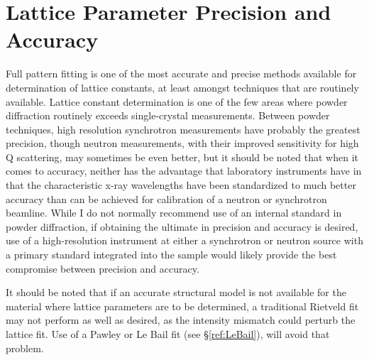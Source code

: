 \section{Lattice Parameter Precision and Accuracy}

Full pattern fitting is one of the most accurate and precise methods available for determination of lattice constants, at least amongst techniques that are routinely available. Lattice constant determination is one of the few areas where powder diffraction routinely exceeds single-crystal measurements. Between powder techniques, high resolution synchrotron measurements have probably the greatest precision, though neutron measurements, with their improved sensitivity for high Q scattering, may sometimes be even better, but it should be noted that when it comes to accuracy, neither has the advantage that laboratory instruments have in that the characteristic x-ray wavelengths have been standardized to much better accuracy than can be achieved for calibration of a neutron or synchrotron beamline. While I do not normally recommend use of an internal standard in powder diffraction, if obtaining the ultimate in precision and accuracy is desired, use of a high-resolution instrument at either a synchrotron or neutron source with a primary standard integrated into the sample would likely provide the best compromise between precision and accuracy. 

It should be noted that if an accurate structural model is not available for the material where lattice parameters are to be determined, a traditional Rietveld fit may not perform as well as desired, as the intensity mismatch could perturb the lattice fit. Use of a Pawley or Le Bail fit (see \S\ref{ref:LeBail}), will avoid that problem. 